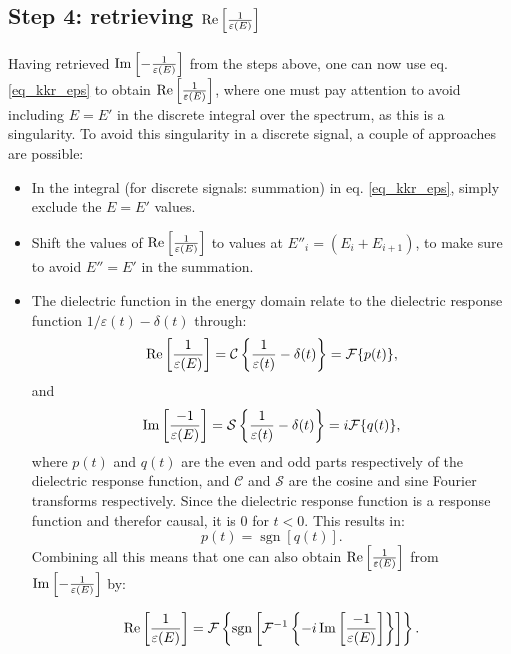 \documentclass[12pt,a4paper]{article}
\def\frac#1#2{{{#1}\over {#2}}}
\numberwithin{equation}{section}
\numberwithin{figure}{section}
\numberwithin{table}{section}
\begin{document}
\subsection{Step 4: retrieving $\operatorname{Re}\left[\frac{1}{\varepsilon(E)}\right]$ }
Having retrieved $\operatorname{Im}\left[-\frac{1}{\varepsilon(E)}\right]$ from the steps above, one can now use eq. \eqref{eq_kkr_eps} to obtain $\operatorname{Re}\left[\frac{1}{\varepsilon(E)}\right]$, where one must pay attention to avoid including $E=E'$ in the discrete integral over the spectrum, as this is a singularity. To avoid this singularity in a discrete signal, a couple of approaches are possible:
\begin{itemize}
    \item In the integral (for discrete signals: summation) in eq. \eqref{eq_kkr_eps}, simply exclude the $E = E'$ values.
    \item Shift the values of $\operatorname{Re}\left[\frac{1}{\varepsilon(E)}\right]$ to values at $E''_i = (E_i + E_{i+1})$, to make sure to avoid $E'' = E'$ in the summation.
    \item  The dielectric function in the energy domain relate to the dielectric response function $1/\varepsilon(t) -\delta(t)$ through:
    \begin{equation}
        \operatorname{Re}\left[\frac{1}{\varepsilon(E)}\right] = \mathcal{C}\left\{\frac{1}{\varepsilon(t)} - \delta(t)\right\} = \mathcal{F}\{p(t)\},
    \end{equation}
    and 
    \begin{equation}
        \operatorname{Im}\left[\frac{-1}{\varepsilon(E)}\right] = \mathcal{S}\left\{\frac{1}{\varepsilon(t)} - \delta(t)\right\} = i\mathcal{F}\{q(t)\},
    \end{equation}
    where $p(t)$ and $q(t)$ are the even and odd parts respectively of the dielectric response function, and $\mathcal{C}$ and $\mathcal{S}$ are the cosine and sine Fourier transforms respectively. Since the dielectric response function is a response function and therefor causal, it is $0$ for $t<0$. This results in:
    \begin{equation}
        p(t) = \operatorname{sgn}[q(t)].
    \end{equation}
    Combining all this means that one can also obtain $\operatorname{Re}\left[\frac{1}{\varepsilon(E)}\right]$ from $\operatorname{Im}\left[-\frac{1}{\varepsilon(E)}\right]$ by:
    
    \begin{equation}
        \operatorname{Re}\left[\frac{1}{\varepsilon(E)}\right] =\mathcal{F}\left\{\operatorname{sgn}\left[\mathcal{F}^{-1}\left\{-i \operatorname{Im}\left[\frac{-1}{ \varepsilon(E)}\right]\right\}\right]\right\}.
    \end{equation}
\end{itemize}
\end{document}
